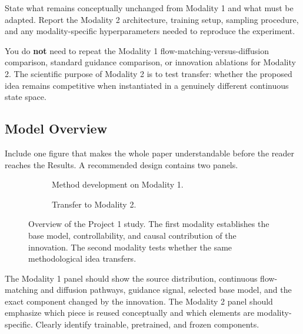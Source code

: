 \documentclass{article}
\begin{document}
State what remains conceptually unchanged from Modality 1 and what must be adapted. Report the Modality 2 architecture, training setup, sampling procedure, and any modality-specific hyperparameters needed to reproduce the experiment.

You do \textbf{not} need to repeat the Modality 1 flow-matching-versus-diffusion comparison, standard guidance comparison, or innovation ablations for Modality 2. The scientific purpose of Modality 2 is to test transfer: whether the proposed idea remains competitive when instantiated in a genuinely different continuous state space.

\subsection{Model Overview}

Include one figure that makes the whole paper understandable before the reader reaches the Results. A recommended design contains two panels.

\begin{figure}[t]
\centering
\begin{subfigure}[t]{0.48\linewidth}
\centering
{}
\caption{Method development on Modality 1.}
\label{fig:modality1_method}
\end{subfigure}
\hfill
\begin{subfigure}[t]{0.48\linewidth}
\centering
{}
\caption{Transfer to Modality 2.}
\label{fig:modality2_transfer}
\end{subfigure}
\caption{Overview of the Project 1 study. The first modality establishes the base model, controllability, and causal contribution of the innovation. The second modality tests whether the same methodological idea transfers.}
\label{fig:project_overview}
\end{figure}

The Modality 1 panel should show the source distribution, continuous flow-matching and diffusion pathways, guidance signal, selected base model, and the exact component changed by the innovation. The Modality 2 panel should emphasize which piece is reused conceptually and which elements are modality-specific. Clearly identify trainable, pretrained, and frozen components.
\end{document}
